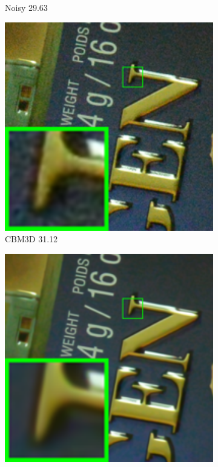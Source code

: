 \begin{figure}
\begin{subfigure}[t]{0.19\textwidth}
		\caption{Noisy 29.63}
    \end{subfigure}
    \hfill
    \begin{subfigure}[t]{0.19\textwidth}
        \centering
        \includegraphics[width=1\textwidth]{images/twsc/cc/resize_br_CBM3D_d800_iso6400_1_real.png}
		\caption{CBM3D 31.12}
    \end{subfigure}
    \hfill
    \begin{subfigure}[t]{0.19\textwidth}
        \centering
        \includegraphics[width=1\textwidth]{images/twsc/cc/resize_br_WNNM_d800_iso6400_1_real.png}

\end{subfigure}
\end{figure}
